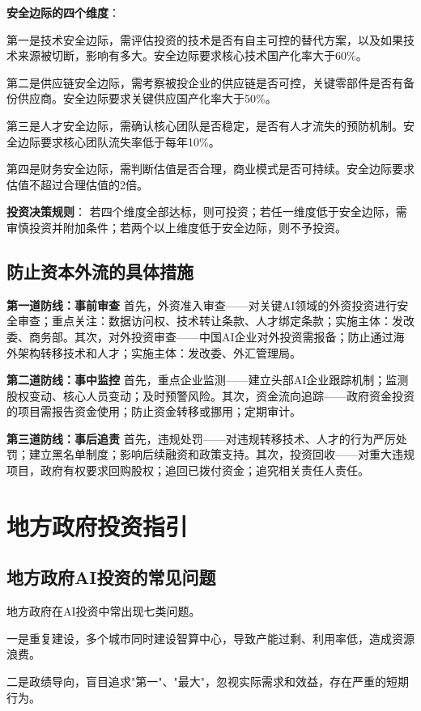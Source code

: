 \textbf{安全边际的四个维度}：

第一是技术安全边际，需评估投资的技术是否有自主可控的替代方案，以及如果技术来源被切断，影响有多大。安全边际要求核心技术国产化率大于60\%。

第二是供应链安全边际，需考察被投企业的供应链是否可控，关键零部件是否有备份供应商。安全边际要求关键供应国产化率大于50\%。

第三是人才安全边际，需确认核心团队是否稳定，是否有人才流失的预防机制。安全边际要求核心团队流失率低于每年10\%。

第四是财务安全边际，需判断估值是否合理，商业模式是否可持续。安全边际要求估值不超过合理估值的2倍。

\textbf{投资决策规则}：
若四个维度全部达标，则可投资；若任一维度低于安全边际，需审慎投资并附加条件；若两个以上维度低于安全边际，则不予投资。

\subsection{防止资本外流的具体措施}

\textbf{第一道防线：事前审查}
首先，外资准入审查——对关键AI领域的外资投资进行安全审查；重点关注：数据访问权、技术转让条款、人才绑定条款；实施主体：发改委、商务部。其次，对外投资审查——中国AI企业对外投资需报备；防止通过海外架构转移技术和人才；实施主体：发改委、外汇管理局。

\textbf{第二道防线：事中监控}
首先，重点企业监测——建立头部AI企业跟踪机制；监测股权变动、核心人员变动；及时预警风险。其次，资金流向追踪——政府资金投资的项目需报告资金使用；防止资金转移或挪用；定期审计。

\textbf{第三道防线：事后追责}
首先，违规处罚——对违规转移技术、人才的行为严厉处罚；建立黑名单制度；影响后续融资和政策支持。其次，投资回收——对重大违规项目，政府有权要求回购股权；追回已拨付资金；追究相关责任人责任。

\section{地方政府投资指引}

\subsection{地方政府AI投资的常见问题}

地方政府在AI投资中常出现七类问题。

一是重复建设，多个城市同时建设智算中心，导致产能过剩、利用率低，造成资源浪费。

二是政绩导向，盲目追求"第一"、"最大"，忽视实际需求和效益，存在严重的短期行为。


